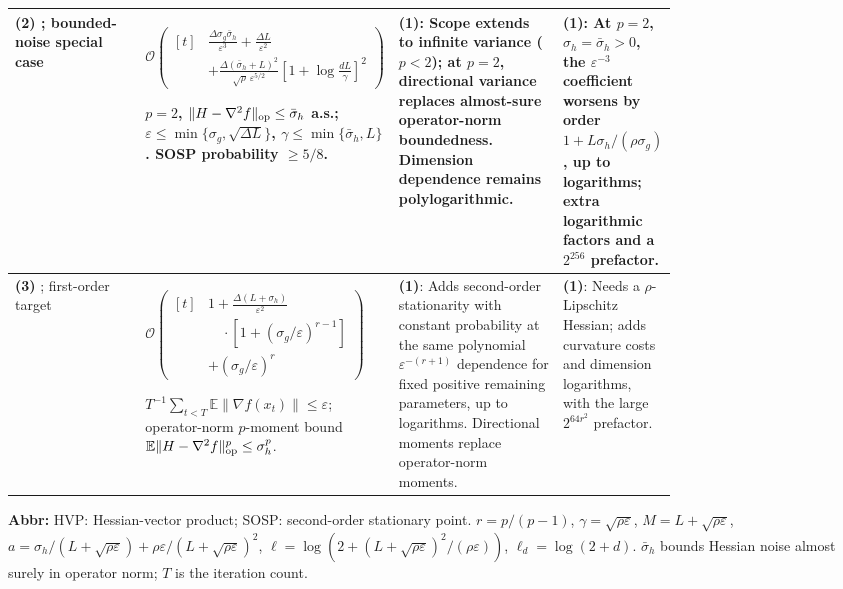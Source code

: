\begin{table}[tp]
\begin{threeparttable}
\begin{tabularx}{\linewidth}{@{}>{\raggedright\arraybackslash}p{0.20\linewidth}>{\raggedright\arraybackslash}p{0.32\linewidth}>{\raggedright\arraybackslash}p{0.25\linewidth}>{\raggedright\arraybackslash}X@{}}
\midrule[1.2pt]
\textbf{(2)} \citep[arXiv v1, Theorem 4]{hthvArjevani2020v1}; bounded-noise special case
& $\mathcal O\!\left(\begin{aligned}[t]
&\frac{\Delta\sigma_g\bar\sigma_h}{\varepsilon^3}+\frac{\Delta L}{\varepsilon^2}\\
&+\frac{\Delta(\bar\sigma_h+L)^2}{\sqrt\rho\,\varepsilon^{5/2}}\left[1+\log\frac{dL}{\gamma}\right]^2
\end{aligned}\right)$\par
$p=2$, $\|H-\nabla^2f\|_{\rm op}\leq\bar\sigma_h$ a.s.; $\varepsilon\leq\min\{\sigma_g,\sqrt{\Delta L}\}$, $\gamma\leq\min\{\bar\sigma_h,L\}$. SOSP probability $\geq5/8$.
& \textbf{(1)}: Scope extends to infinite variance ($p<2$); at $p=2$, directional variance replaces almost-sure operator-norm boundedness. Dimension dependence remains polylogarithmic.
& \textbf{(1)}: At $p=2$, $\sigma_h=\bar\sigma_h>0$, the $\varepsilon^{-3}$ coefficient worsens by order $1+L\sigma_h/(\rho\sigma_g)$, up to logarithms; extra logarithmic factors and a $2^{256}$ prefactor. \\
\midrule
\textbf{(3)} \citep[Theorem 2]{hthvSadiev2025v1}; first-order target
& $\mathcal O\!\left(\begin{aligned}[t]
&1+\frac{\Delta(L+\sigma_h)}{\varepsilon^2}\\
&\quad\cdot[1+(\sigma_g/\varepsilon)^{r-1}]\\
&+(\sigma_g/\varepsilon)^r
\end{aligned}\right)$\par
$T^{-1}\sum_{t<T}\mathbb E\|\nabla f(x_t)\|\leq\varepsilon$; operator-norm $p$-moment bound $\mathbb E\|H-\nabla^2f\|_{\rm op}^p\leq\sigma_h^p$.
& \textbf{(1)}: Adds second-order stationarity with constant probability at the same polynomial $\varepsilon^{-(r+1)}$ dependence for fixed positive remaining parameters, up to logarithms. Directional moments replace operator-norm moments.
& \textbf{(1)}: Needs a $\rho$-Lipschitz Hessian; adds curvature costs and dimension logarithms, with the large $2^{64r^2}$ prefactor. \\
\bottomrule
\end{tabularx}
\begin{tablenotes}[flushleft]\footnotesize
\item[] \textbf{Abbr:} HVP: Hessian-vector product; SOSP: second-order stationary point. $r=p/(p-1)$, $\gamma=\sqrt{\rho\varepsilon}$, $M=L+\sqrt{\rho\varepsilon}$, $a=\sigma_h/(L+\sqrt{\rho\varepsilon})+\rho\varepsilon/(L+\sqrt{\rho\varepsilon})^2$, $\ell=\log(2+(L+\sqrt{\rho\varepsilon})^2/(\rho\varepsilon))$, $\ell_d=\log(2+d)$. $\bar\sigma_h$ bounds Hessian noise almost surely in operator norm; $T$ is the iteration count.
\end{tablenotes}
\end{threeparttable}
\end{table}
